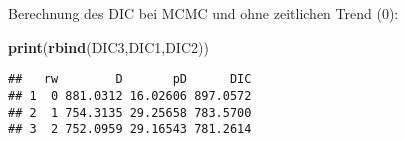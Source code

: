 \documentclass[ignorenonframetext,]{beamer}
\newenvironment{Shaded}{\begin{snugshade}}{\end{snugshade}}
\newcommand{\KeywordTok}[1]{\textcolor[rgb]{0.13,0.29,0.53}{\textbf{{#1}}}}
\newcommand{\NormalTok}[1]{{#1}}
\begin{document}
\begin{frame}{Berechnung des DIC bei MCMC}
und ohne zeitlichen Trend (0):

\begin{Shaded}
\begin{Highlighting}[]
\KeywordTok{print}\NormalTok{(}\KeywordTok{rbind}\NormalTok{(DIC3,DIC1,DIC2))}
\end{Highlighting}
\end{Shaded}

\begin{verbatim}
##   rw        D       pD      DIC
## 1  0 881.0312 16.02606 897.0572
## 2  1 754.3135 29.25658 783.5700
## 3  2 752.0959 29.16543 781.2614
\end{verbatim}

\end{frame}
\end{document}
